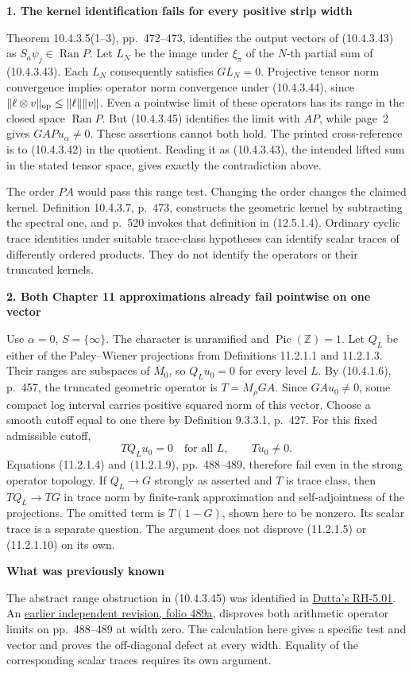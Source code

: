 \documentclass[11pt]{article}
\newcommand{\Z}{\mathbb Z}\newcommand{\A}{\mathbb A}
\newcommand{\topic}[1]{\par\medskip\textbf{#1}\par}
\newcommand{\page}[1]{\newpage{\Large\bfseries\color{ink}#1}\par\smallskip}
\begin{document}
\page{Consequences for the printed theorems}
\topic{1. The kernel identification fails for every positive strip width}
Theorem 10.4.3.5(1--3), pp.~472--473, identifies the output vectors of (10.4.3.43) as \(S_a\psi_j\in\operatorname{Ran}P\). Let \(L_N\) be the image under \(\xi_\pi\) of the \(N\)-th partial sum of (10.4.3.43). Each \(L_N\) consequently satisfies \(G L_N=0\). Projective tensor norm convergence implies operator norm convergence under (10.4.3.44), since \(\|\ell\otimes v\|_{\rm op}\le\|\ell\|\|v\|\). Even a pointwise limit of these operators has its range in the closed space \(\operatorname{Ran}P\). But (10.4.3.45) identifies the limit with \(AP\), while page~2 gives \(GAPu_\alpha\ne0\). These assertions cannot both hold. The printed cross-reference is to (10.4.3.42) in the quotient. Reading it as (10.4.3.43), the intended lifted sum in the stated tensor space, gives exactly the contradiction above.

The order \(PA\) would pass this range test. Changing the order changes the claimed kernel. Definition 10.4.3.7, p.~473, constructs the geometric kernel by subtracting the spectral one, and p.~520 invokes that definition in (12.5.1.4). Ordinary cyclic trace identities under suitable trace-class hypotheses can identify scalar traces of differently ordered products. They do not identify the operators or their truncated kernels.
\topic{2. Both Chapter 11 approximations already fail pointwise on one vector}
Use \(\alpha=0\), \(S=\{\infty\}\). The character is unramified and \(\operatorname{Pic}(\Z)=1\). Let \(Q_L\) be either of the Paley--Wiener projections from Definitions 11.2.1.1 and 11.2.1.3. Their ranges are subspaces of \(M_0\), so \(Q_Lu_0=0\) for every level \(L\). By (10.4.1.6), p.~457, the truncated geometric operator is \(T=M_\rho GA\). Since \(GAu_0\ne0\), some compact log interval carries positive squared norm of this vector. Choose a smooth cutoff equal to one there by Definition 9.3.3.1, p.~427. For this fixed admissible cutoff,
\[
                  TQ_Lu_0=0\quad\text{for all }L,\qquad Tu_0\ne0 .
\]
Equations (11.2.1.4) and (11.2.1.9), pp.~488--489, therefore fail even in the strong operator topology. If \(Q_L\to G\) strongly as asserted and \(T\) is trace class, then \(TQ_L\to TG\) in trace norm by finite-rank approximation and self-adjointness of the projections. The omitted term is \(T(1-G)\), shown here to be nonzero. Its scalar trace is a separate question. The argument does not disprove (11.2.1.5) or (11.2.1.10) on its own.
\topic{What was previously known}
The abstract range obstruction in (10.4.3.45) was identified in \href{https://github.com/SanchayanDutta/masullo-rh/blob/5e539d64bddc9420c099956521a02531e306d3de/bugs/RH-5.01-projection-order-and-spectral-range.md}{Dutta's RH-5.01}. An \href{https://github.com/Titulus233/The-Music-of-the-Primes-Revise/blob/4a9ad5765d4a2dfb237f874695ee4f4a07817867/src/the-music-of-the-primes-revised.tex}{earlier independent revision, folio 489a}, disproves both arithmetic operator limits on pp.~488--489 at width zero. The calculation here gives a specific test and vector and proves the off-diagonal defect at every width. Equality of the corresponding scalar traces requires its own argument.
\end{document}

